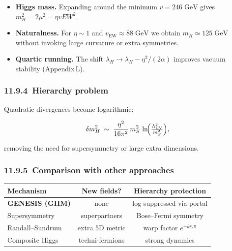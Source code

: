 \documentclass{article}
\begin{document}
\begin{itemize}
\item \textbf{Higgs mass.}
      Expanding around the minimum $v=246\;\mathrm{GeV}$ gives
      \(
        m_{H}^{2}=2\mu^{2}= \eta vEW^2.
      \)
\item \textbf{Naturalness.}
      For $\eta\!\sim\!1$ and $v_{\text{EW}}\!\approx\!88\;\mathrm{GeV}$
      we obtain $m_{H}\simeq125\;\mathrm{GeV}$ without invoking large curvature  
      or extra symmetries.

\item \textbf{Quartic running.}
      The shift
      $\lambda_{H}\!\to\!\lambda_{H}-\eta^{2}/(2\alpha)$
      improves vacuum stability (Appendix L).
\end{itemize}

\subsubsection*{11.9.4 Hierarchy problem}

Quadratic divergences become logarithmic:

\[
  \delta m_{H}^{2}\;\sim\;
  \frac{\eta^{2}}{16\pi^{2}}\,
  m_{S}^{2}\,
  \ln\!\Bigl(\tfrac{\Lambda_{\text{UV}}^{2}}{m_{S}^{2}}\Bigr),
\]

removing the need for supersymmetry or large extra dimensions.

\subsubsection*{11.9.5 Comparison with other approaches}

\begin{center}
\begin{tabular}{lcc}
\toprule
Mechanism                & New fields? & Hierarchy protection \\ \midrule
\textbf{GENESIS (GHM)}   & none        & log‑suppressed via portal \\ 
Supersymmetry            & superpartners & Bose–Fermi symmetry \\ 
Randall–Sundrum          & extra 5D metric & warp factor $e^{-kr_c\pi}$ \\ 
Composite Higgs          & techni‑fermions & strong dynamics \\ 
\bottomrule
\end{tabular}
\end{center}
\end{document}
